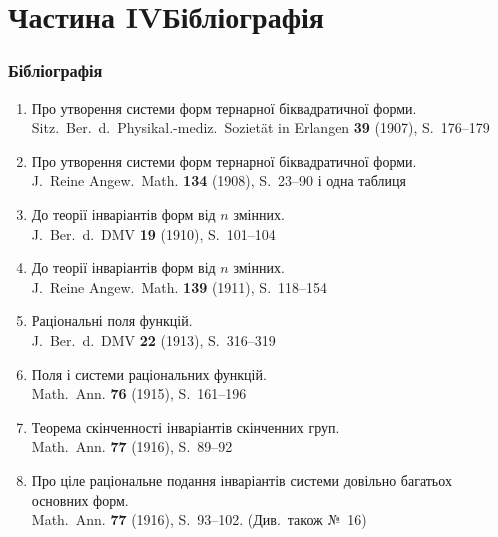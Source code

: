 \documentclass[11pt]{article}
\newcommand{\foreign}[1]{#1}
\begin{document}
\part*{Частина IV\hspace{1em}Бібліографія}

\section*{Бібліографія}

\begin{enumerate}[label={\small\arabic*.},leftmargin=2em,itemsep=0.3em]
\item Про утворення системи форм тернарної біквадратичної форми.\\
\foreign{Sitz.\ Ber.\ d.\ Physikal.-mediz.\ Sozietät in Erlangen} \textbf{39} (1907), S.~176--179

\item Про утворення системи форм тернарної біквадратичної форми.\\
\foreign{J.\ Reine Angew.\ Math.} \textbf{134} (1908), S.~23--90 і одна таблиця

\item До теорії інваріантів форм від $n$ змінних.\\
\foreign{J.\ Ber.\ d.\ DMV} \textbf{19} (1910), S.~101--104

\item До теорії інваріантів форм від $n$ змінних.\\
\foreign{J.\ Reine Angew.\ Math.} \textbf{139} (1911), S.~118--154

\item Раціональні поля функцій.\\
\foreign{J.\ Ber.\ d.\ DMV} \textbf{22} (1913), S.~316--319

\item Поля і системи раціональних функцій.\\
\foreign{Math.\ Ann.} \textbf{76} (1915), S.~161--196

\item Теорема скінченності інваріантів скінченних груп.\\
\foreign{Math.\ Ann.} \textbf{77} (1916), S.~89--92

\item Про ціле раціональне подання інваріантів системи довільно багатьох основних форм.\\
\foreign{Math.\ Ann.} \textbf{77} (1916), S.~93--102. (Див.\ також №~16)


\end{enumerate}
\end{document}
